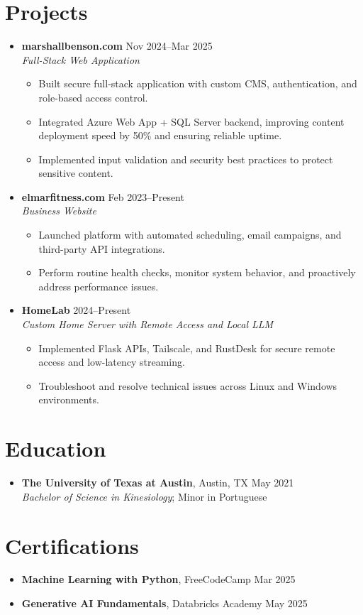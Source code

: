 \documentclass[letterpaper,10pt]{article}
\newcommand{\resumeItem}[1]{\item \small{#1}}
\begin{document}
\section*{Projects}
\begin{itemize}
  \item[]
    \textbf{marshallbenson.com} \hfill Nov 2024--Mar 2025 \\
    \textit{Full-Stack Web Application}
  \begin{itemize}
    \resumeItem{Built secure full-stack application with custom CMS, authentication, and role-based access control.}
    \resumeItem{Integrated Azure Web App + SQL Server backend, improving content deployment speed by 50\% and ensuring reliable uptime.}
    \resumeItem{Implemented input validation and security best practices to protect sensitive content.}
  \end{itemize}

  \item[]
    \textbf{elmarfitness.com} \hfill Feb 2023--Present \\
    \textit{Business Website}
  \begin{itemize}
    \resumeItem{Launched platform with automated scheduling, email campaigns, and third-party API integrations.}
    \resumeItem{Perform routine health checks, monitor system behavior, and proactively address performance issues.}
  \end{itemize}

  \item[]
    \textbf{HomeLab} \hfill 2024--Present \\
    \textit{Custom Home Server with Remote Access and Local LLM}
  \begin{itemize}
    \resumeItem{Implemented Flask APIs, Tailscale, and RustDesk for secure remote access and low-latency streaming.}
    \resumeItem{Troubleshoot and resolve technical issues across Linux and Windows environments.}
  \end{itemize}
\end{itemize}

\section*{Education}
\begin{itemize}
  \resumeItem{\textbf{The University of Texas at Austin}, Austin, TX \hfill May 2021 \\ \textit{Bachelor of Science in Kinesiology}; Minor in Portuguese}
\end{itemize}

\section*{Certifications}
\begin{itemize}
  \resumeItem{\textbf{Machine Learning with Python}, FreeCodeCamp \hfill Mar 2025}
  \resumeItem{\textbf{Generative AI Fundamentals}, Databricks Academy \hfill May 2025}
\end{itemize}
\end{document}
